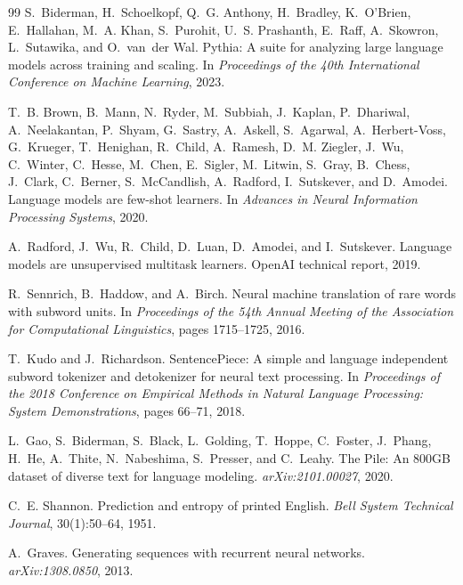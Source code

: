 \documentclass[11pt,a4paper]{article}
\begin{document}
\begin{thebibliography}{99}
S.~Biderman, H.~Schoelkopf, Q.~G. Anthony, H.~Bradley, K.~O'Brien, E.~Hallahan, M.~A. Khan, S.~Purohit, U.~S. Prashanth, E.~Raff, A.~Skowron, L.~Sutawika, and O.~van~der Wal.
\newblock Pythia: A suite for analyzing large language models across training and scaling.
\newblock In \emph{Proceedings of the 40th International Conference on Machine Learning}, 2023.

T.~B. Brown, B.~Mann, N.~Ryder, M.~Subbiah, J.~Kaplan, P.~Dhariwal, A.~Neelakantan, P.~Shyam, G.~Sastry, A.~Askell, S.~Agarwal, A.~Herbert-Voss, G.~Krueger, T.~Henighan, R.~Child, A.~Ramesh, D.~M. Ziegler, J.~Wu, C.~Winter, C.~Hesse, M.~Chen, E.~Sigler, M.~Litwin, S.~Gray, B.~Chess, J.~Clark, C.~Berner, S.~McCandlish, A.~Radford, I.~Sutskever, and D.~Amodei.
\newblock Language models are few-shot learners.
\newblock In \emph{Advances in Neural Information Processing Systems}, 2020.

A.~Radford, J.~Wu, R.~Child, D.~Luan, D.~Amodei, and I.~Sutskever.
\newblock Language models are unsupervised multitask learners.
\newblock OpenAI technical report, 2019.

R.~Sennrich, B.~Haddow, and A.~Birch.
\newblock Neural machine translation of rare words with subword units.
\newblock In \emph{Proceedings of the 54th Annual Meeting of the Association for Computational Linguistics}, pages 1715--1725, 2016.

T.~Kudo and J.~Richardson.
\newblock SentencePiece: A simple and language independent subword tokenizer and detokenizer for neural text processing.
\newblock In \emph{Proceedings of the 2018 Conference on Empirical Methods in Natural Language Processing: System Demonstrations}, pages 66--71, 2018.

L.~Gao, S.~Biderman, S.~Black, L.~Golding, T.~Hoppe, C.~Foster, J.~Phang, H.~He, A.~Thite, N.~Nabeshima, S.~Presser, and C.~Leahy.
\newblock The Pile: An 800GB dataset of diverse text for language modeling.
\newblock \emph{arXiv:2101.00027}, 2020.

C.~E. Shannon.
\newblock Prediction and entropy of printed English.
\newblock \emph{Bell System Technical Journal}, 30(1):50--64, 1951.

A.~Graves.
\newblock Generating sequences with recurrent neural networks.
\newblock \emph{arXiv:1308.0850}, 2013.


\end{thebibliography}
\end{document}
